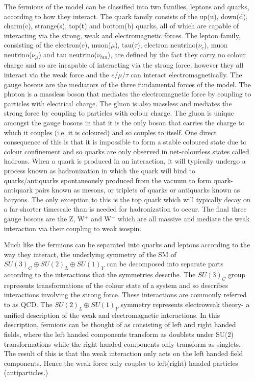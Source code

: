 The fermions of the model can be classified into two families, leptons and quarks, according to how they interact. The quark family consists of the up(u), down(d), charm(c), strange(s), top(t) and bottom(b) quarks, all of which are capable of interacting via the strong, weak and electromagnetic forces. The lepton family, consisting of the electron(e), muon($\mu$), tau($\tau$), electron neutrino($\nu_{e}$), muon neutrino($\nu_{\mu}$) and tau neutrino($\nu_{tau}$), are defined by the fact they carry no colour charge and so are incapable of interacting via the strong force, however they all interact via the weak force and the $e$/$\mu$/$\tau$ can interact electromagnetically. The gauge bosons are the mediators of the three fundamental forces of the model. The photon is a massless boson that mediates the electromagnetic force by coupling to particles with electrical charge. The gluon is also massless and mediates the strong force by coupling to particles with colour charge. The gluon is unique amongst the gauge bosons in that it is the only boson that carries the charge to which it couples (i.e. it is coloured) and so couples to itself. One direct consequence of this is that it is impossible to form a stable coloured state due to colour confinement and so quarks are only observed in net-colourless states called hadrons. When a quark is produced in an interaction, it will typically undergo a process known as hadronization in which the quark will bind to quarks/antiquarks spontaneously produced from the vacuum to form quark-antiquark pairs known as mesons, or triplets of quarks or antiquarks known as baryons. The only exception to this is the top quark which will typically decay on a far shorter timescale than is needed for hadronization to occur. The final three gauge bosons are the Z, W$^+$ and W$^-$ which are all massive and mediate the weak interaction via their coupling to weak isospin.

Much like the fermions can be separated into quarks and leptons according to the way they interact, the underlying symmetry of the \ac{SM} of $SU(3)_{C}\oplus SU(2)_{L}\oplus SU(1)_{Y}$ can be decomposed into separate parts according to the interactions that the symmetries describe. The $SU(3)_{C}$ group represents transformations of the colour state of a system and so describes interactions involving the strong force. These interactions are commonly referred to as \ac{QCD}. The $SU(2)_{L}\oplus SU(1)_{Y}$ symmetry represents electroweak theory- a unified description of the weak and electromagnetic interactions. In this description, fermions can be thought of as consisting of left and right handed fields, where the left handed components transform as doublets under SU(2) transformations while the right handed components only transform as singlets. The result of this is that the weak interaction only acts on the left handed field components. Hence the weak force only couples to left(right) handed particles (antiparticles.) 

